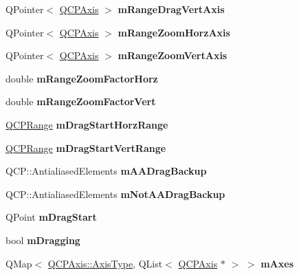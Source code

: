 \begin{DoxyCompactItemize}
Q\+Pointer$<$ \hyperlink{class_q_c_p_axis}{Q\+C\+P\+Axis} $>$ {\bfseries m\+Range\+Drag\+Vert\+Axis}
\item 
\mbox{\label{class_q_c_p_axis_rect_ae22f882bab20518559f3fbb84243d0ab}} 
Q\+Pointer$<$ \hyperlink{class_q_c_p_axis}{Q\+C\+P\+Axis} $>$ {\bfseries m\+Range\+Zoom\+Horz\+Axis}
\item 
\mbox{\label{class_q_c_p_axis_rect_a8b9acd16a203a9692bd35a9465f54bc1}} 
Q\+Pointer$<$ \hyperlink{class_q_c_p_axis}{Q\+C\+P\+Axis} $>$ {\bfseries m\+Range\+Zoom\+Vert\+Axis}
\item 
\mbox{\label{class_q_c_p_axis_rect_ad08d0250ed7b99de387d0ea6c7fd4dc1}} 
double {\bfseries m\+Range\+Zoom\+Factor\+Horz}
\item 
\mbox{\label{class_q_c_p_axis_rect_a32f063629581d5bf82b12769940b34ad}} 
double {\bfseries m\+Range\+Zoom\+Factor\+Vert}
\item 
\mbox{\label{class_q_c_p_axis_rect_a41936cf473ec638bec382f5a40cdb1f3}} 
\hyperlink{class_q_c_p_range}{Q\+C\+P\+Range} {\bfseries m\+Drag\+Start\+Horz\+Range}
\item 
\mbox{\label{class_q_c_p_axis_rect_a1a5ae4c74b8bd46baf91bf4e4f4165f0}} 
\hyperlink{class_q_c_p_range}{Q\+C\+P\+Range} {\bfseries m\+Drag\+Start\+Vert\+Range}
\item 
\mbox{\label{class_q_c_p_axis_rect_aa4a24f76360cfebe1bcf17a77fa7521b}} 
Q\+C\+P\+::\+Antialiased\+Elements {\bfseries m\+A\+A\+Drag\+Backup}
\item 
\mbox{\label{class_q_c_p_axis_rect_a6fcb12e052e276d57efbb128be31d6f5}} 
Q\+C\+P\+::\+Antialiased\+Elements {\bfseries m\+Not\+A\+A\+Drag\+Backup}
\item 
\mbox{\label{class_q_c_p_axis_rect_a032896b28f83a58010d8d533b78c49df}} 
Q\+Point {\bfseries m\+Drag\+Start}
\item 
\mbox{\label{class_q_c_p_axis_rect_ab49a6698194cf0e9e38a1d734c0888a8}} 
bool {\bfseries m\+Dragging}
\item 
\mbox{\label{class_q_c_p_axis_rect_aba63dc1a70deabdba9c6a3b415eb1add}} 
Q\+Map$<$ \hyperlink{class_q_c_p_axis_ae2bcc1728b382f10f064612b368bc18a}{Q\+C\+P\+Axis\+::\+Axis\+Type}, Q\+List$<$ \hyperlink{class_q_c_p_axis}{Q\+C\+P\+Axis} $\ast$ $>$ $>$ {\bfseries m\+Axes}
\end{DoxyCompactItemize}
